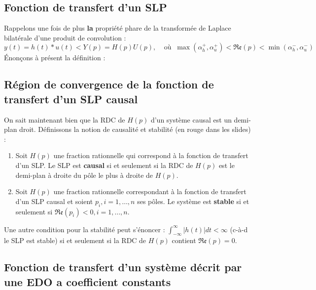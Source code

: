 	\subsection{Fonction de transfert d'un SLP}
	Rappelons une fois de plus \textbf{la} propriété phare de la transformée de Laplace
	bilatérale d'une produit de convolution :
	\begin{equation}
	y(t) = h(t)*u(t) \lt Y(p) = H(p)U(p), \ \ \ \ \ \text{où }\ \max(\alpha_h^+,
	\alpha_u^+) < \mathfrak{Re}(p)< \min(\alpha_h^-,\alpha_u^-)
	\end{equation}
	Énonçons à présent la définition :
	
	
	
	\subsection{Région de convergence de la fonction de transfert d'un SLP causal}
	On sait maintenant bien que la RDC de $H(p)$ d'un système causal est un demi-plan
	droit. Définissons la notion de causalité et stabilité (en rouge dans les slides) :
	
	\begin{enumerate}
	\item Soit $H(p)$ une fraction rationnelle qui correspond à la fonction de transfert 
	d’un SLP. Le SLP est \textbf{causal} si et seulement si la RDC de $H(p)$ est le demi-plan
	à droite du pôle le plus à droite de $H(p)$.
	\item Soit $H(p)$ une fraction rationnelle correspondant à la fonction de transfert d’un 
	SLP causal et soient $p_i, i=1,\dots,n$ ses pôles. Le système est \textbf{stable} si et 
	seulement si $\mathfrak{Re}(p_i) <0, i=1,\dots,n$.
	\end{enumerate}
	Une autre condition pour la stabilité peut s'énoncer : $\int_{-\infty}^\infty |h(t)|dt <
	\infty$ (c-à-d le SLP est stable) si et seulement si la RDC de $H(p)$ contient $\mathfrak{
	Re}(p) = 0$.
	
	
	\subsection{Fonction de transfert d'un système décrit par une EDO a coefficient constants}
